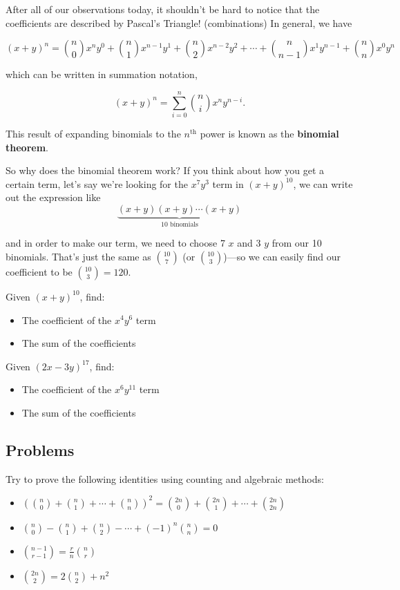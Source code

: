 After all of our observations today, it shouldn't be hard to notice that the coefficients are described by Pascal's Triangle! (combinations) In general, we have

$$(x+y)^n = \binom{n}{0}x^n y^0 + \binom{n}{1}x^{n-1}y^1 + \binom{n}{2}x^{n-2}y^2 + \cdots + \binom{n}{n-1}x^1 y^{n-1} + \binom{n}{n}x^0 y^n$$

which can be written in summation notation,

$$(x+y)^{n}=\sum^{n}_{i=0}\displaystyle\binom{n}{i}x^{n}y^{n-i}.$$

This result of expanding binomials to the $n^{\text{th}}$ power is known as the \textbf{binomial theorem}.

So why does the binomial theorem work? If you think about how you get a certain term, let's say we're looking for the $x^7y^3$ term in $(x+y)^{10}$, we can write out the expression like
$$\underbrace{(x+y)(x+y)\cdots(x+y)}_{\text{10 binomials}}$$

and in order to make our term, we need to choose 7 $x$ and 3 $y$ from our 10 binomials. That's just the same as $\binom{10}{7}$ (or $\binom{10}{3}$)---so we can easily find our coefficient to be $\binom{10}{3} = 120$.

\begin{problem}
Given $\displaystyle (x + y)^{10}$, find:

\begin{itemize}
    \item The coefficient of the $x^{4}y^{6}$ term
    \item The sum of the coefficients
\end{itemize}
\end{problem}

\begin{problem}
Given $\displaystyle (2x - 3y)^{17}$, find:

\begin{itemize}
    \item The coefficient of the $x^{6}y^{11}$ term
    \item The sum of the coefficients
\end{itemize}
\end{problem}

\subsection{Problems}

\begin{problem}
Try to prove the following identities using counting and algebraic methods:

\begin{itemize}
    \item $\left(\binom{n}{0}+\binom{n}{1}+\cdots+\binom{n}{n} \right)^2 = \binom{2n}{0}+\binom{2n}{1}+\cdots+\binom{2n}{2n}$
    \item $\binom{n}{0}-\binom{n}{1}+\binom{n}{2}-\cdots+(-1)^n \binom{n}{n}=0$
    \item $\binom{n-1}{r-1} = \frac{r}{n}\binom{n}{r}$
    \item $\binom{2n}{2} = 2\binom{n}{2}+n^2$
\end{itemize}
\end{problem}

